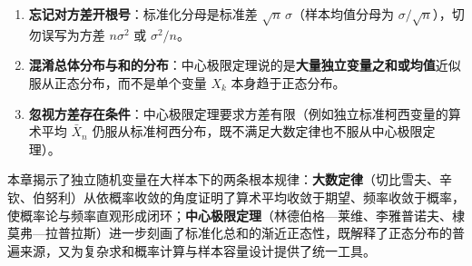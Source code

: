 \begin{pitfall}[极限应用中的三类常见误区]
\begin{enumerate}
  \item \textbf{忘记对方差开根号}：标准化分母是标准差 $\sqrt{n}\,\sigma$（样本均值分母为 $\sigma/\sqrt{n}$），切勿误写为方差 $n\sigma^2$ 或 $\sigma^2/n$。
  \item \textbf{混淆总体分布与和的分布}：中心极限定理说的是\textbf{大量独立变量之和或均值}近似服从正态分布，而不是单个变量 $X_k$ 本身趋于正态分布。
  \item \textbf{忽视方差存在条件}：中心极限定理要求方差有限（例如独立标准柯西变量的算术平均 $\bar{X}_n$ 仍服从标准柯西分布，既不满足大数定律也不服从中心极限定理）。
\end{enumerate}
\end{pitfall}

\begin{summary}[第五章核心脉络]
本章揭示了独立随机变量在大样本下的两条根本规律：\textbf{大数定律}（切比雪夫、辛钦、伯努利）从依概率收敛的角度证明了算术平均收敛于期望、频率收敛于概率，使概率论与频率直观形成闭环；\textbf{中心极限定理}（林德伯格—莱维、李雅普诺夫、棣莫弗—拉普拉斯）进一步刻画了标准化总和的渐近正态性，既解释了正态分布的普遍来源，又为复杂求和概率计算与样本容量设计提供了统一工具。
\end{summary}
